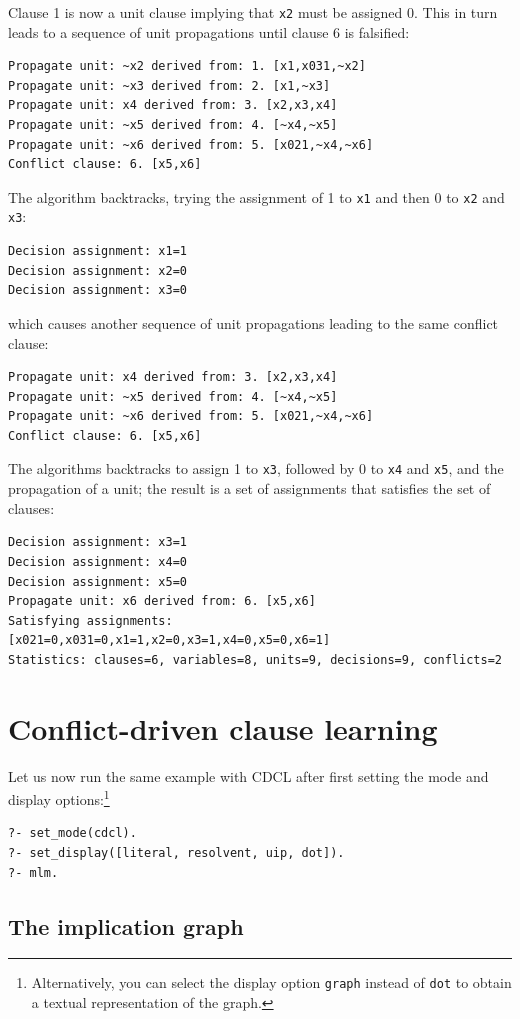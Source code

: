 \documentclass[11pt]{report}
\newcommand*{\p}[1]{\textup{\texttt{#1}}}
\begin{document}
Clause 1 is now a unit clause implying that \p{x2} must be assigned 0.
This in turn leads to a sequence of unit propagations until clause 6 is
falsified:
\begin{verbatim}
Propagate unit: ~x2 derived from: 1. [x1,x031,~x2]
Propagate unit: ~x3 derived from: 2. [x1,~x3]
Propagate unit: x4 derived from: 3. [x2,x3,x4]
Propagate unit: ~x5 derived from: 4. [~x4,~x5]
Propagate unit: ~x6 derived from: 5. [x021,~x4,~x6]
Conflict clause: 6. [x5,x6]
\end{verbatim}

The algorithm backtracks, trying the assignment of 1 to \p{x1} and then
0 to \p{x2} and \p{x3}:
\begin{verbatim}
Decision assignment: x1=1
Decision assignment: x2=0
Decision assignment: x3=0
\end{verbatim}
which causes another sequence of unit propagations leading to the same
conflict clause:
\begin{verbatim}
Propagate unit: x4 derived from: 3. [x2,x3,x4]
Propagate unit: ~x5 derived from: 4. [~x4,~x5]
Propagate unit: ~x6 derived from: 5. [x021,~x4,~x6]
Conflict clause: 6. [x5,x6]
\end{verbatim}

The algorithms backtracks to assign 1 to \p{x3}, followed by 0 to \p{x4}
and \p{x5}, and the propagation of a unit; the result is a set of
assignments that satisfies the set of clauses:
\begin{verbatim}
Decision assignment: x3=1
Decision assignment: x4=0
Decision assignment: x5=0
Propagate unit: x6 derived from: 6. [x5,x6]
Satisfying assignments:
[x021=0,x031=0,x1=1,x2=0,x3=1,x4=0,x5=0,x6=1]
Statistics: clauses=6, variables=8, units=9, decisions=9, conflicts=2
\end{verbatim}


\section{Conflict-driven clause learning}

Let us now run the same example with CDCL after first setting
the mode and display options:\footnote{Alternatively, you
can select the display option \p{graph} instead of \p{dot} to obtain a
textual representation of the graph.}
\begin{verbatim}
?- set_mode(cdcl).
?- set_display([literal, resolvent, uip, dot]).
?- mlm.
\end{verbatim}

\subsection{The implication graph}
\end{document}
